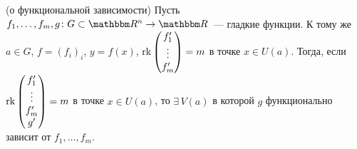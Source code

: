 \documentclass[12pt,trimbord]{../../../notes}
\begin{document}
\begin{thrm}(о функциональной зависимости)\label{thrm:diffspace::funcdep}
  Пусть $f_1, \dotsc, f_m, g \colon G \subset \R^n \to \R$~--- гладкие функции. К тому же
  $a\in G$, $f = (f_i)_i$, $y = f(x)$, 
  $
    \operatorname{rk} \begin{pmatrix}
      f_1' \\ \vdots \\ f_m' 
    \end{pmatrix} = m
  $ в точке $x\in U(a)$.
  Тогда, если 
  $
    \operatorname{rk} \begin{pmatrix}
      f_1' \\ \vdots \\ f_m' \\ g' 
    \end{pmatrix} = m
  $ в точке $x \in U(a)$, то $\exists\, V(a)$ в которой $g$ функционально зависит от $f_1, \dotsc,
  f_m$.
\end{thrm}
\end{document}
